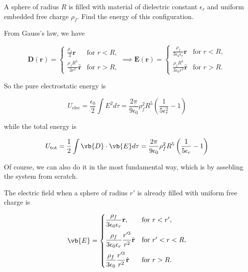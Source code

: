 \documentclass[english,a4paper,12pt]{report}
\begin{document}
{A sphere of radius \(R\) is filled with material of dielectric constant \(\epsilon _{r} \) and uniform embedded free charge \(\rho _{f} \). Find the energy of this configuration.}
{From Gauss's law, we have

\begin{equation}
    \mathbf{D}(\mathbf{r}) =
    \begin{cases}
    \displaystyle \frac{\rho_f}{3} \mathbf{r} & \text{for } r < R, \\[10pt]
    \displaystyle \frac{\rho_f R^3 }{3r^2} \hat{\mathbf{r}} & \text{for } r > R,
    \end{cases}
    \implies 
    \mathbf{E}(\mathbf{r}) =
    \begin{cases}
    \displaystyle \frac{\rho_f}{3 \epsilon_0 \epsilon_r} \mathbf{r} & \text{for } r < R, \\[10pt]
    \displaystyle \frac{\rho_f R^3}{3 \epsilon_0 r^2} \hat{\mathbf{r}} & \text{for } r > R.
    \end{cases}
\end{equation}

So the pure electrostatic energy is 

\begin{equation}
    U_{\text{elec} }  = \frac{\epsilon _{0} }{2}  \int E^2d\tau = \frac{2\pi }{9\epsilon_0 }\rho _{f}^2R^{5}\left( \frac{1}{5\epsilon _{r}^2 }-1  \right)   
\end{equation}

while the total energy is 

\begin{equation}
    U_{\text{tot} }  = \frac{1}{2} \int \vb{D} \cdot \vb{E} d\tau =  \frac{2\pi }{9\epsilon_0 }\rho _{f}^2R^{5}\left( \frac{1}{5\epsilon _{r} }-1  \right)
\end{equation}

Of course, we can also do it in the most fundamental way, which is by assebling the system from scratch.

The electric field when a sphere of radius \(r'\) is already filled with uniform free charge is 

\begin{equation}
    \vb{E}  =
    \begin{cases}
        \displaystyle\frac{\rho_f}{3 \epsilon_0 \epsilon_r} \mathbf{r}, & \text{for } r < r', \\[10pt]
        \displaystyle\frac{\rho_f}{3 \epsilon_0 \epsilon_r} \frac{r'^3}{r^2} \hat{\mathbf{r}} & \text{for } r' < r < R, \\[10pt]
        \displaystyle\frac{\rho_f}{3 \epsilon_0} \frac{r'^3}{r^2} \hat{\mathbf{r}} & \text{for } r > R.
    \end{cases}
\end{equation}

}
\end{document}
